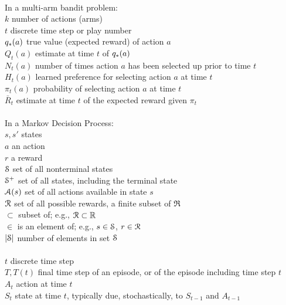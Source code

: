 \documentclass[10pt,fleqn]{article}
\begin{document}
\begin{tabbing}
\\
\>In a multi-arm bandit problem:\\
\>$k$                 \> number of actions (arms)\\
\>$t$                 \> discrete time step or play number\\
\>$\qstar(a)$         \> true value (expected reward) of action $a$\\
\>$Q_t(a)$            \> estimate at time $t$ of $\qstar(a)$\\
\>$N_t(a)$            \> number of times action $a$ has been selected up prior to time $t$\\
\>$H_t(a)$            \> learned preference for selecting action $a$ at time $t$\\
\>$\pi_t(a)$          \> probability of selecting action $a$ at time $t$\\
\>$\bar R_t$          \> estimate at time $t$ of the expected reward given $\pi_t$\\
\\
\>In a Markov Decision Process:\\
\>$s, s'$             \> states\\
\>$a$                 \> an action\\
\>$r$                 \> a reward\\
\>$\S$                \> set of all nonterminal states \\
\>$\S^+$              \> set of all states, including the terminal state \\
\>$\A(s)$             \> set of all actions available in state $s$\\
\>$\R$                \> set of all possible rewards, a finite subset of $\Re$\\
\>$\subset$           \> subset of; e.g., $\R\subset\Re$\\
\>$\in$               \> is an element of; e.g., $s\in\S$, $r\in\R$\\
\>$|\S|$              \> number of elements in set $\S$\\
\\
\>$t$                 \> discrete time step\\
\>$T, T(t)$           \> final time step of an episode, or of the episode including time step $t$\\ 
\>$A_t$               \> action at time $t$\\
\>$S_t$               \> state at time $t$, typically due, stochastically, to $S_{t-1}$ and $A_{t-1}$\\

\end{tabbing}
\end{document}
